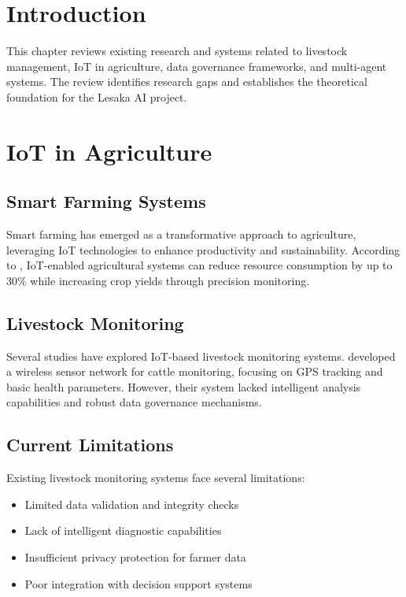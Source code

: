 
\section{Introduction}

This chapter reviews existing research and systems related to livestock management, IoT in agriculture, data governance frameworks, and multi-agent systems. The review identifies research gaps and establishes the theoretical foundation for the Lesaka AI project.

\section{IoT in Agriculture}

\subsection{Smart Farming Systems}

Smart farming has emerged as a transformative approach to agriculture, leveraging IoT technologies to enhance productivity and sustainability. According to \cite{wolfert2017big}, IoT-enabled agricultural systems can reduce resource consumption by up to 30\% while increasing crop yields through precision monitoring.

\subsection{Livestock Monitoring}

Several studies have explored IoT-based livestock monitoring systems. \cite{riquelme2018smonitor} developed a wireless sensor network for cattle monitoring, focusing on GPS tracking and basic health parameters. However, their system lacked intelligent analysis capabilities and robust data governance mechanisms.

\subsection{Current Limitations}

Existing livestock monitoring systems face several limitations:

\begin{itemize}
    \item Limited data validation and integrity checks
    \item Lack of intelligent diagnostic capabilities
    \item Insufficient privacy protection for farmer data
    \item Poor integration with decision support systems
\end{itemize}

